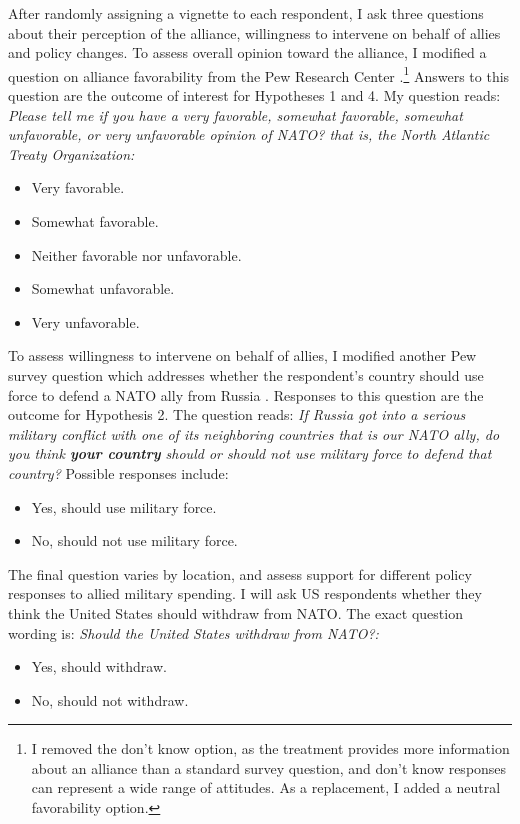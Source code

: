 \documentclass[12pt]{article}
\begin{document}
After randomly assigning a vignette to each respondent, I ask three questions about their perception of the alliance, willingness to intervene on behalf of allies and policy changes. 
To assess overall opinion toward the alliance, I modified a question on alliance favorability from the Pew Research Center \citep{PewNATO2020}.\footnote{I removed the don't know option, as the treatment provides more information about an alliance than a standard survey question, and don't know responses can represent a wide range of attitudes. As a replacement, I added a neutral favorability option.} 
Answers to this question are the outcome of interest for Hypotheses 1 and 4. 
My question reads: \textit{Please tell me if you have a very favorable, somewhat favorable, somewhat unfavorable, or very unfavorable opinion of NATO? that is, the North Atlantic Treaty Organization:} 
\begin{itemize}
\item Very favorable. 
\item Somewhat favorable.  
\item Neither favorable nor unfavorable. 
\item Somewhat unfavorable. 
\item Very unfavorable. 
\end{itemize}


To assess willingness to intervene on behalf of allies, I modified another Pew survey question which addresses whether the respondent's country should use force to defend a NATO ally from Russia \citep{PewNATO2020}. 
Responses to this question are the outcome for Hypothesis 2.  
The question reads: \textit{If Russia got into a serious military conflict with one of its neighboring countries that is our NATO ally, do you think \textbf{your country} should or should not use military force to defend that country?}
Possible responses include: 
\begin{itemize}
\item Yes, should use military force.  
\item No, should not use military force.   
\end{itemize}


The final question varies by location, and assess support for different policy responses to allied military spending. 
I will ask US respondents whether they think the United States should withdraw from NATO.
The exact question wording is: \textit{Should the United States withdraw from NATO?:} 
\begin{itemize}
\item Yes, should withdraw.
\item No, should not withdraw. 
\end{itemize}
\end{document}
